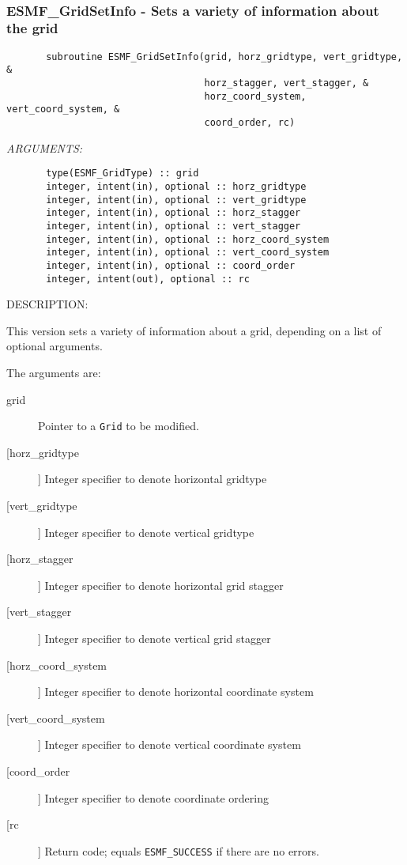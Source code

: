  
\mbox{}\hrulefill\ 
 
\subsubsection{ESMF\_GridSetInfo - Sets a variety of information about the grid}


 
\begin{verbatim}       subroutine ESMF_GridSetInfo(grid, horz_gridtype, vert_gridtype, &
                                   horz_stagger, vert_stagger, &
                                   horz_coord_system, vert_coord_system, &
                                   coord_order, rc)\end{verbatim}{\em ARGUMENTS:}
\begin{verbatim}       type(ESMF_GridType) :: grid
       integer, intent(in), optional :: horz_gridtype
       integer, intent(in), optional :: vert_gridtype
       integer, intent(in), optional :: horz_stagger
       integer, intent(in), optional :: vert_stagger
       integer, intent(in), optional :: horz_coord_system
       integer, intent(in), optional :: vert_coord_system
       integer, intent(in), optional :: coord_order
       integer, intent(out), optional :: rc\end{verbatim}
{\sf DESCRIPTION:\\ }


       This version sets a variety of information about a grid, depending
       on a list of optional arguments.
  
       The arguments are:
       \begin{description}
       \item[grid]
            Pointer to a {\tt Grid} to be modified.
       \item[[horz\_gridtype]]
            Integer specifier to denote horizontal gridtype
       \item[[vert\_gridtype]]
            Integer specifier to denote vertical gridtype
       \item[[horz\_stagger]]
            Integer specifier to denote horizontal grid stagger
       \item[[vert\_stagger]]
            Integer specifier to denote vertical grid stagger
       \item[[horz\_coord\_system]]
            Integer specifier to denote horizontal coordinate system
       \item[[vert\_coord\_system]]
            Integer specifier to denote vertical coordinate system
       \item[[coord\_order]]
            Integer specifier to denote coordinate ordering
       \item[[rc]]
            Return code; equals {\tt ESMF\_SUCCESS} if there are no errors.
       \end{description}
   
